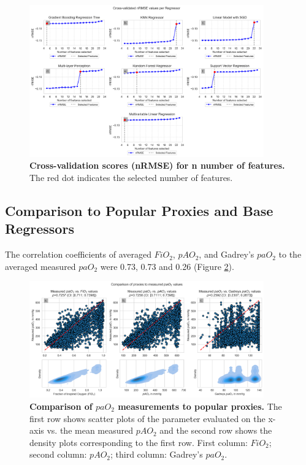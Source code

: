 \documentclass[referee,lineno,pdflatex,sn-nature]{sn-jnl}%
\theoremstyle{thmstyleone}%
\theoremstyle{thmstyletwo}%
\theoremstyle{thmstylethree}%
\begin{document}
\begin{figure}[h]
\centering
\includegraphics[width=0.9\textwidth]{images/Figure2.png}
\caption{\textbf{Cross-validation scores (nRMSE) for n number of features.} The red dot indicates the selected number of features.}\label{fig2}
\end{figure}


\subsection{Comparison to Popular Proxies and Base Regressors}\label{sec3.3}
The correlation coefficients of averaged $FiO_2$, $pAO_2$, and Gadrey's $paO_2$ to the averaged measured $paO_2$ were 0.73, 0.73 and 0.26 (Figure \ref{fig3}). 

\begin{figure}[h]
\centering
\includegraphics[width=0.9\textwidth]{images/Figure3.png}
\caption{\textbf{Comparison of $paO_2$ measurements to popular proxies.} The first row shows scatter plots of the parameter evaluated on the x-axis vs. the mean measured $pAO_2$ and the second row shows the density plots corresponding to the first row. First column: $FiO_2$; second column: $pAO_2$; third column: Gadrey’s $paO_2$.}\label{fig3}
\end{figure}
\end{document}
